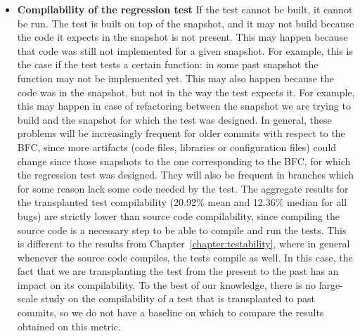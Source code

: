 \begin{itemize}
\item \textbf{Compilability of the regression test} If the test cannot be built, it cannot be run. The test is built on top of the snapshot, and it may not build because the code it expects in the snapshot is not present. This may happen because that code was still not implemented for a given snapshot. For example, this is the case if the test tests a certain function: in some past snapshot the function may not be implemented yet. This may also happen because the code was in the snapshot, but not in the way the test expects it. For example, this may happen in case of refactoring between the snapshot we are trying to build and the snapshot for which the test was designed. In general, these problems will be increasingly frequent for older commits with respect to the BFC, since more artifacts (code files, libraries or configuration files) could change since those snapshots to the one corresponding to the BFC, for which the regression test was designed. They will also be frequent in branches which for some reason lack some code needed by the test.
The aggregate results for the transplanted test compilability (20.92\% mean and 12.36\% median for all bugs) are strictly lower than source code compilability, since compiling the source code is a necessary step to be able to compile and run the tests. 
This is different to the results from Chapter~\ref{chapter:testability}, where in general whenever the source code compiles, the tests compile as well. 
In this case, the fact that we are transplanting the test from the present to the past has an impact on its compilability.
To the best of our knowledge, there is no large-scale study on the compilability of a test that is transplanted to past commits, so we do not have a baseline on which to compare the results obtained on this metric.


\end{itemize}
